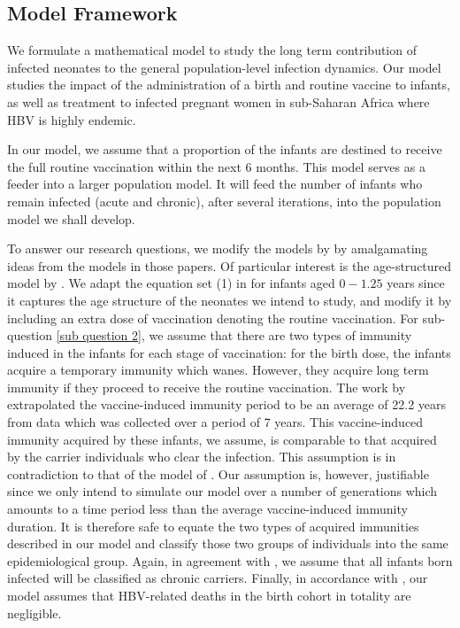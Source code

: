 \subsection{Model Framework}
We formulate a mathematical model to study the long term contribution of infected neonates to the general population-level infection dynamics. Our model studies the  impact of the administration of a birth and routine vaccine to infants, as well as treatment to infected pregnant women in sub-Saharan Africa where HBV is highly endemic.  

In our model, we assume that a proportion of the infants are destined to receive the full routine vaccination within the next 6 months. This model serves as a feeder into a larger population model. It will feed the number of infants who remain infected (acute and chronic),  after several iterations, into the population model we shall develop.

To answer our research questions, we modify the models by \cite{mann2011modelling_NewZealand,zou2010modeling} by amalgamating ideas from the models in those papers. Of particular interest is the age-structured model by \cite{mann2011modelling_NewZealand}. We adapt the equation set (1) in \cite{mann2011modelling_NewZealand} for infants aged $0-1.25$ years since it captures the age structure of the neonates we intend to study, and modify it by including an extra dose of vaccination denoting the routine vaccination. For sub-question \ref{sub question 2}, we assume that there are two types of immunity induced in the infants for each stage of vaccination: for the birth dose, the infants acquire a temporary immunity which wanes. However, they acquire long term immunity if they proceed to receive the routine vaccination. The work by \cite{mclean1994modelling} extrapolated the vaccine-induced immunity period to be an average of 22.2 years from data which was collected over a period of 7 years. This vaccine-induced immunity acquired by these infants, we assume, is comparable to that acquired by the carrier individuals who clear the infection. This assumption is in contradiction to that of the model of \cite{zou2010modeling}. Our assumption is, however, justifiable since we only intend to simulate our model over a number of generations which amounts to a time period less than the average vaccine-induced immunity duration. It is therefore safe to equate the two types of acquired immunities described in our model and classify those two groups of individuals into the same epidemiological group. Again, in agreement with \cite{zhang2012analysisHBVmodel}, we assume that all infants born infected will be classified as chronic carriers. Finally, in accordance with \cite{mann2011modelling_NewZealand}, our model assumes that HBV-related deaths in the birth cohort in totality are negligible.


